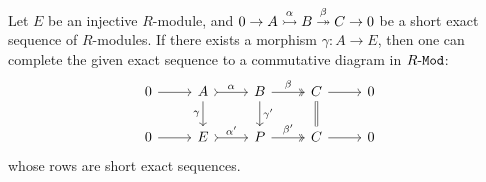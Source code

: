 \begin{lemma}
    \label{lem:injective-module-completing-sequences}
    Let \(E\) be an injective \(R\)-module, and
    \(0 \to A \overset \alpha {\rightarrowtail} B \overset \beta {\twoheadrightarrow} C \to 0\) be a short exact
    sequence of \(R\)-modules. If there exists a morphism \(\gamma: A \to E\), then
    one can complete the given exact sequence to a commutative diagram in
    \({R\text{-}\texttt{Mod}}\):
    \[
        \begin{tikzcd}
            0 \ar[r]
            &A \ar[r, tail, "\alpha"] \ar[d, "\gamma"']
            &B \ar[r, two heads, "\beta"] \ar[d, "\gamma'"]
            &C \ar[d, equals] \ar[r]
            &0
            \\
            0 \ar[r]
            &E \ar[r, tail, "\alpha'"]
            &P \ar[r, two heads, "\beta'"]
            &C \ar[r]
            &0
        \end{tikzcd}
    \]
    whose rows are short exact sequences.
\end{lemma}

